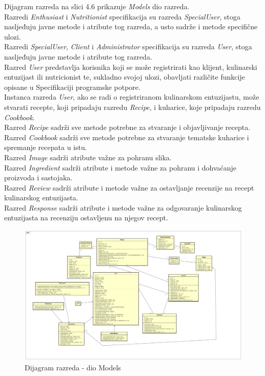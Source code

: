 Dijagram razreda na slici 4.6 prikazuje \textit{Models} dio razreda. \\
	Razredi \textit{Enthusiast} i \textit{Nutritionist} specifikacija su razreda \textit{SpecialUser}, stoga nasljeđuju javne metode i atribute tog razreda, a usto sadrže i metode specifične ulozi. \\
	Razredi \textit{SpecialUser}, \textit{Client} i \textit{Administrator} specifikacija su razreda \textit{User}, stoga nasljeđuju javne metode i atribute tog razreda. \\
	Razred \textit{User} predstavlja korisnika koji se može registrirati kao klijent, kulinarski entuzijast ili nutricionist te, sukladno svojoj ulozi, obavljati različite funkcije opisane u Specifikaciji programske potpore. \\
    Instanca razreda \textit{User}, ako se radi o registriranom kulinarskom entuzijastu, može stvarati recepte, koji pripadaju razredu \textit{Recipe}, i kuharice, koje pripadaju razredu \textit{Cookbook}. \\
    Razred \textit{Recipe} sadrži sve metode potrebne za stvaranje i objavljivanje recepta. \\
    Razred \textit{Cookbook} sadrži sve metode potrebne za stvaranje tematske kuharice i spremanje recepata u istu. \\
    Razred \textit{Image} sadrži atribute važne za pohranu slika. \\
    Razred \textit{Ingredient} sadrži atribute i metode važne za pohranu i dohvaćanje proizvoda i sastojaka. \\
    Razred \textit{Review} sadrži atribute i metode važne za ostavljanje recenzije na recept kulinarskog entuzijasta. \\
    Razred \textit{Response} sadrži atribute i metode važne za odgovaranje kulinarskog entuzijasta na recenziju ostavljenu na njegov recept.
			
			
			\begin{figure}[H]
			\includegraphics[scale=0.2]{dijagrami/UML_dijagram_razreda_models.png} %
			\centering
			\caption{Dijagram razreda - dio Models}
			\label{Dijagram razreda - dio Models}
		\end{figure}
		
